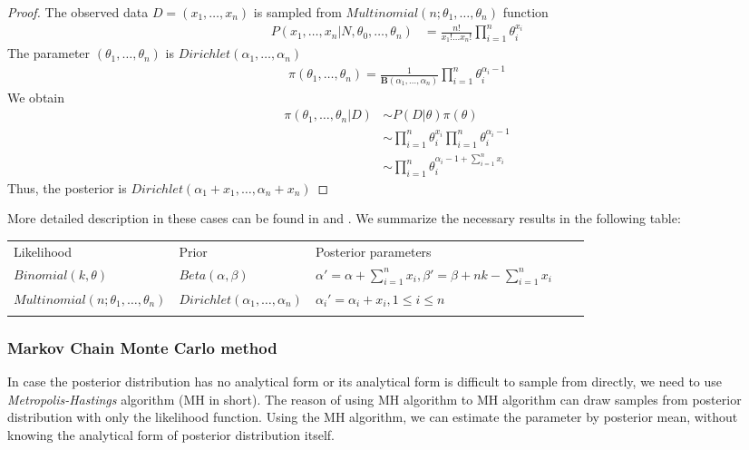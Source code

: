 \documentclass[12pt]{article}
\theoremstyle{definition}
\begin{document}
\begin{proof}
  The observed data $D=(x_1,\ldots,x_n)$ is sampled from $Multinomial(n; \theta_1,\ldots,\theta_n)$ function
  \begin{align*}
    P(x_1,\ldots,x_n | N, \theta_0,\ldots,\theta_n) &= \frac{n!}{x_1!\ldots x_n!} \prod_{i=1}^n\theta_i^{x_i}
  \end{align*}
  The parameter $(\theta_1,\ldots,\theta_n)$ is
  $Dirichlet(\alpha_1,\ldots,\alpha_n)$
  \begin{align*}
    \pi(\theta_1,\ldots,\theta_n) = \frac{1}{\mathbf{B}(\alpha_1,\ldots,\alpha_n)}\prod_{i=1}^n\theta_i^{\alpha_i - 1}
  \end{align*}
  We obtain
  \begin{align*}
    \pi(\theta_1,\ldots,\theta_n|D) &\sim P(D|\theta)\pi(\theta) \\
                                    &\sim \prod_{i=1}^n\theta_i^{x_i} \prod_{i=1}^n\theta_i^{\alpha_i - 1} \\
                                    &\sim \prod_{i=1}^n\theta_i^{\alpha_i - 1 + \sum_{i=1}^n x_i}
  \end{align*}
  Thus, the posterior is $Dirichlet(\alpha_1 +  x_1,\ldots,\alpha_n
  +  x_n)$
\end{proof}
More detailed description in these cases can be found in \cite{tu2014dirichlet}
and \cite{baron2019probability}. We summarize the necessary results in the following table:
\begin{table}[]
\begin{tabular}{lllll}
\cline{1-3}
\multicolumn{1}{|l|}{Likelihood} & \multicolumn{1}{l|}{Prior} & \multicolumn{1}{l|}{Posterior parameters} &  &  \\ \cline{1-3}
  \multicolumn{1}{|l|}{$Binomial(k, \theta)$}  & \multicolumn{1}{l|}{$Beta(\alpha, \beta)$}  & \multicolumn{1}{l|}{$\alpha' = \alpha + \sum_{i=1}^n x_i, \beta' = \beta + nk -\sum_{i=1}^n x_i$}  &  &  \\ \cline{1-3}
  \multicolumn{1}{|l|}{$Multinomial(n; \theta_1,\ldots,\theta_n)$}  & \multicolumn{1}{l|}{$Dirichlet(\alpha_1,\ldots,\alpha_n)$}  & \multicolumn{1}{l|}{$\alpha_i' =\alpha_i + x_i, 1 \leq i \leq n$}  &  &  \\ \cline{1-3}
                        &                        &                        &  & 
\end{tabular}
\end{table}

\subsubsection{Markov Chain Monte Carlo method}
In case the posterior distribution has no analytical form or its analytical form
is difficult to sample from directly, we need to use
\textit{Metropolis-Hastings} algorithm (MH in short). The reason of using MH
algorithm to MH algorithm can draw samples from posterior distribution with only
the likelihood function. Using the MH algorithm, we can estimate the parameter
by posterior mean, without knowing the analytical form of posterior distribution
itself.
\end{document}
